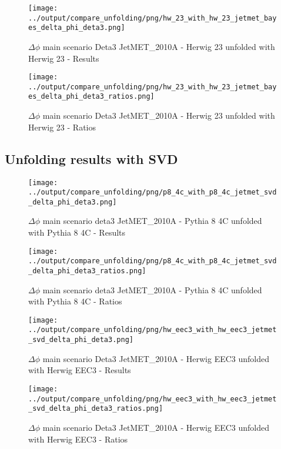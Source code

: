 \documentclass[11pt]{book}
\begin{document}
\begin{figure}[ht]
\centering
\texttt{[image: ../output/compare\_unfolding/png/hw\_23\_with\_hw\_23\_jetmet\_bayes\_delta\_phi\_deta3.png]}
\caption{$\Delta\phi$ main scenario Deta3 JetMET\_2010A - Herwig 23 unfolded with Herwig 23 - Results}
\label{hw_23_hw_23_jetmet_bayes_delta_phi_deta3_a}
\end{figure}

\begin{figure}[ht]
\centering
\texttt{[image: ../output/compare\_unfolding/png/hw\_23\_with\_hw\_23\_jetmet\_bayes\_delta\_phi\_deta3\_ratios.png]}
\caption{$\Delta\phi$ main scenario Deta3 JetMET\_2010A - Herwig 23 unfolded with Herwig 23 - Ratios}
\label{hw_23_hw_23_jetmet_bayes_delta_phi_deta3_b}
\end{figure}



\clearpage
\subsection{Unfolding results with SVD}

\begin{figure}[ht]
\centering
\texttt{[image: ../output/compare\_unfolding/png/p8\_4c\_with\_p8\_4c\_jetmet\_svd\_delta\_phi\_deta3.png]}
\caption{$\Delta\phi$ main scenario deta3 JetMET\_2010A - Pythia 8 4C unfolded with Pythia 8 4C - Results}
\label{p8_p8_jetmet_svd_delta_phi_deta3_a}
\end{figure}

\begin{figure}[ht]
\centering
\texttt{[image: ../output/compare\_unfolding/png/p8\_4c\_with\_p8\_4c\_jetmet\_svd\_delta\_phi\_deta3\_ratios.png]}
\caption{$\Delta\phi$ main scenario deta3 JetMET\_2010A - Pythia 8 4C unfolded with Pythia 8 4C - Ratios}
\label{p8_p8_jetmet_svd_delta_phi_deta3_b}
\end{figure}

\begin{figure}[ht]
\centering
\texttt{[image: ../output/compare\_unfolding/png/hw\_eec3\_with\_hw\_eec3\_jetmet\_svd\_delta\_phi\_deta3.png]}
\caption{$\Delta\phi$ main scenario Deta3 JetMET\_2010A - Herwig EEC3 unfolded with Herwig EEC3 - Results}
\label{hw_eec3_hw_eec3_jetmet_svd_delta_phi_deta3_a}
\end{figure}

\begin{figure}[ht]
\centering
\texttt{[image: ../output/compare\_unfolding/png/hw\_eec3\_with\_hw\_eec3\_jetmet\_svd\_delta\_phi\_deta3\_ratios.png]}
\caption{$\Delta\phi$ main scenario Deta3 JetMET\_2010A - Herwig EEC3 unfolded with Herwig EEC3 - Ratios}
\label{hw_eec3_hw_eec3_jetmet_svd_delta_phi_deta3_b}
\end{figure}
\end{document}
